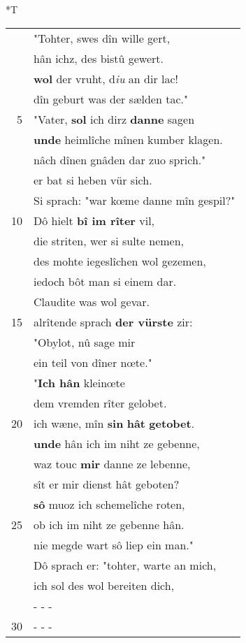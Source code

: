 \documentclass[8pt,a4paper,notitlepage]{article}
\begin{document}
\begin{table}[ht]
\begin{minipage}[t]{0.5\linewidth}
\small
\begin{center}*T
\end{center}
\begin{tabular}{rl}
 & "Tohter, swes dîn wille gert,\\ 
 & hân ichz, des bistû gewert.\\ 
 & \textbf{wol} der vruht, d\textit{iu} an dir lac!\\ 
 & dîn geburt was der sælden tac."\\ 
5 & "Vater, \textbf{sol} ich dirz \textbf{danne} sagen\\ 
 & \textbf{unde} heimlîche mînen kumber klagen.\\ 
 & nâch dînen gnâden dar zuo sprich."\\ 
 & er bat si heben vür sich.\\ 
 & Si sprach: "war kœme danne mîn gespil?"\\ 
10 & Dô hielt \textbf{bî im rîter} vil,\\ 
 & die striten, wer si sulte nemen,\\ 
 & des mohte iegeslîchen wol gezemen,\\ 
 & iedoch bôt man si einem dar.\\ 
 & Claudite was wol gevar.\\ 
15 & alrîtende sprach \textbf{der vürste} zir:\\ 
 & "Obylot, nû sage mir\\ 
 & ein teil von dîner nœte."\\ 
 & "\textbf{Ich hân} kleinœte\\ 
 & dem vremden rîter gelobet.\\ 
20 & ich wæne, mîn \textbf{sin} \textbf{hât} \textbf{getobet}.\\ 
 & \textbf{unde} hân ich im niht ze gebenne,\\ 
 & waz touc \textbf{mir} danne ze lebenne,\\ 
 & sît er mir dienst hât geboten?\\ 
 & \textbf{sô} muoz ich schemelîche roten,\\ 
25 & ob ich im niht ze gebenne hân.\\ 
 & nie megde wart sô liep ein man."\\ 
 & Dô sprach er: "tohter, warte an mich,\\ 
 & ich sol des wol bereiten dich,\\ 
 & \multicolumn{1}{l}{ - - - }\\ 
30 & \multicolumn{1}{l}{ - - - }\\ 

\end{tabular}
\end{minipage}
\end{table}
\end{document}
